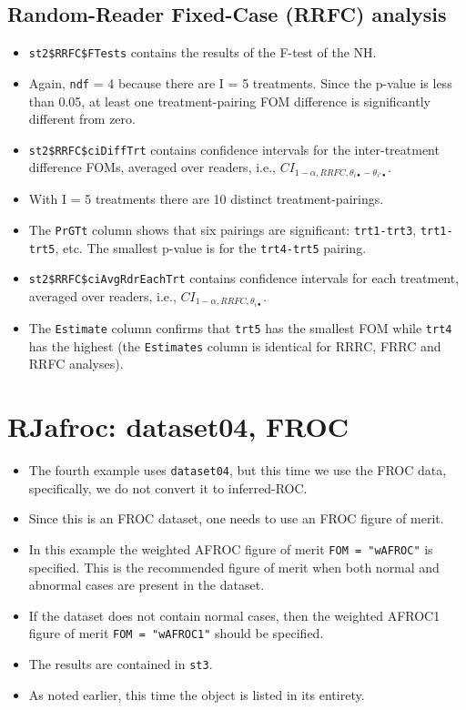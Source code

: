 \documentclass[
]{book}
\providecommand{\tightlist}{%
  \setlength{\itemsep}{0pt}\setlength{\parskip}{0pt}}
\begin{document}
\hypertarget{ORApplications-RRFC-dataset04}{%
\subsection{Random-Reader Fixed-Case (RRFC) analysis}\label{ORApplications-RRFC-dataset04}}

\begin{itemize}
\item
  \texttt{st2\$RRFC\$FTests} contains the results of the F-test of the NH.
\item
  Again, \texttt{ndf} = 4 because there are I = 5 treatments. Since the p-value is less than 0.05, at least one treatment-pairing FOM difference is significantly different from zero.
\item
  \texttt{st2\$RRFC\$ciDiffTrt} contains confidence intervals for the inter-treatment difference FOMs, averaged over readers, i.e., \(CI_{1-\alpha,RRFC,\theta_{i \bullet} - \theta_{i' \bullet}}\).
\item
  With I = 5 treatments there are 10 distinct treatment-pairings.
\item
  The \texttt{PrGTt} column shows that six pairings are significant: \texttt{trt1-trt3}, \texttt{trt1-trt5}, etc. The smallest p-value is for the \texttt{trt4-trt5} pairing.
\item
  \texttt{st2\$RRFC\$ciAvgRdrEachTrt} contains confidence intervals for each treatment, averaged over readers, i.e., \(CI_{1-\alpha,RRFC,\theta_{i \bullet}}\).
\item
  The \texttt{Estimate} column confirms that \texttt{trt5} has the smallest FOM while \texttt{trt4} has the highest (the \texttt{Estimates} column is identical for RRRC, FRRC and RRFC analyses).
\end{itemize}

\hypertarget{ORApplications-dataset04-FROC-RJafroc}{%
\section{RJafroc: dataset04, FROC}\label{ORApplications-dataset04-FROC-RJafroc}}

\begin{itemize}
\tightlist
\item
  The fourth example uses \texttt{dataset04}, but this time we use the FROC data, specifically, we do not convert it to inferred-ROC.
\item
  Since this is an FROC dataset, one needs to use an FROC figure of merit.
\item
  In this example the weighted AFROC figure of merit \texttt{FOM\ =\ "wAFROC"} is specified. This is the recommended figure of merit when both normal and abnormal cases are present in the dataset.
\item
  If the dataset does not contain normal cases, then the weighted AFROC1 figure of merit \texttt{FOM\ =\ "wAFROC1"} should be specified.
\item
  The results are contained in \texttt{st3}.
\item
  As noted earlier, this time the object is listed in its entirety.
\end{itemize}
\end{document}
